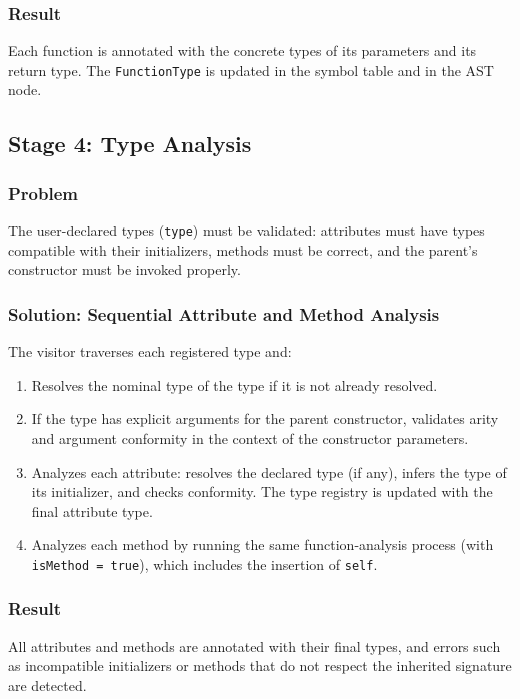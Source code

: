 \documentclass[12pt,a4paper]{report}
\begin{document}
\subsubsection{Result}
Each function is annotated with the concrete types of its parameters and its return type.
The \texttt{FunctionType} is updated in the symbol table and in the AST node.

\subsection{Stage 4: Type Analysis}

\subsubsection{Problem}
The user-declared types (\texttt{type}) must be validated: attributes must have types compatible with their initializers,
methods must be correct, and the parent's constructor must be invoked properly.

\subsubsection{Solution: Sequential Attribute and Method Analysis}

The visitor traverses each registered type and:

\begin{enumerate}
    \item Resolves the nominal type of the type if it is not already resolved.
    \item If the type has explicit arguments for the parent constructor, validates arity and argument conformity in the context of the constructor parameters.
    \item Analyzes each attribute: resolves the declared type (if any), infers the type of its initializer,
    and checks conformity.
    The type registry is updated with the final attribute type.
    \item Analyzes each method by running the same function-analysis process (with \texttt{isMethod = true}),
    which includes the insertion of \texttt{self}.
\end{enumerate}

\subsubsection{Result}
All attributes and methods are annotated with their final types,
and errors such as incompatible initializers or methods that do not respect the inherited signature are detected.
\end{document}
